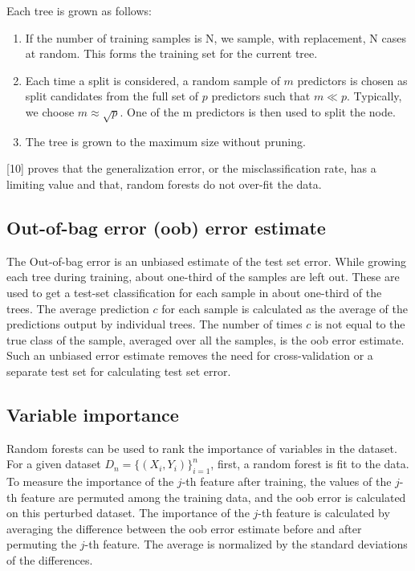 Each tree is grown as follows:
\begin{enumerate}
    \item If the number of training samples is N, we sample, with replacement, N cases at random.
    This forms the training set for the current tree.
    \item Each time a split is considered, a random sample of $m$ predictors is chosen as split
    candidates from the full set of $p$ predictors such that $m \ll p$. Typically, we
    choose $m \approx \sqrt{p}$. One of the m predictors is then used to split the node.
    \item The tree is grown to the maximum size without pruning.
\end{enumerate}

[10] proves that the generalization error, or the misclassification rate, has a limiting value 
and that, random forests do not over-fit the data.

\subsection{Out-of-bag error (oob) error estimate}
The Out-of-bag error is an unbiased estimate of the test set error. While growing each tree during
training, about one-third of the samples are left out. These are used to get a test-set
classification for each sample in about one-third of the trees. The average prediction $c$ for each
sample is calculated as the average of the predictions output by individual trees.
The number of times $c$ is not equal to the true class of the sample, averaged
over all the samples, is the oob error estimate. Such an unbiased error estimate removes
the need for cross-validation or a separate test set for calculating test set error. 

\subsection{Variable importance}
Random forests can be used to rank the importance of variables in the dataset.
For a given dataset $D_{n} = \{(X_i, Y_i)\}_{i=1}^{n}$, first, a random forest is fit to the data.
To measure the importance of the $j$-th feature after training, the values of the $j$-th feature are
permuted among the training data, and the oob error is calculated on this perturbed dataset. The
importance of the $j$-th feature is calculated by averaging the difference between the oob error
estimate before and after permuting the $j$-th feature. The average is normalized by the
standard deviations of the differences.

